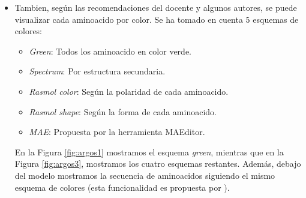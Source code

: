 \documentclass{article}
\begin{document}
\begin{itemize}
	\item Tambien, según las recomendaciones del docente y algunos autores, se puede visualizar cada aminoacido por color. Se ha tomado en cuenta 5 esquemas de colores: 
		\begin{itemize}
			\item \textit{Green}: Todos los aminoacido en color verde.
			\item \textit{Spectrum}: Por estructura secundaria.
			\item \textit{Rasmol color}: Según la polaridad de cada aminoacido.
			\item \textit{Rasmol shape}: Según la forma de cada aminoacido.
			\item \textit{MAE}: Propuesta por la herramienta MAEditor.
		\end{itemize}
	
	En la Figura \ref{fig:argos1} mostramos el esquema \textit{green}, mientras que en la Figura \ref{fig:argos3}, mostramos los cuatro esquemas restantes. Además, debajo del modelo mostramos la secuencia de aminoacidos siguiendo el mismo esquema de colores (esta funcionalidad es propuesta por \cite{youkharibache2017twelve}).
	

\end{itemize}
\end{document}
